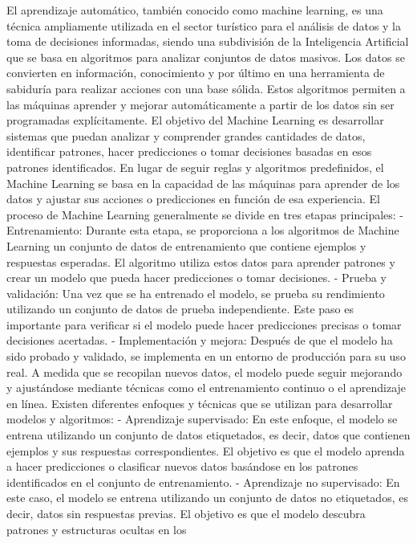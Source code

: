 \documentclass[
  letterpaper,
  DIV=11,
  numbers=noendperiod]{scrreprt}
\begin{document}
El aprendizaje automático, también conocido como machine learning, es
una técnica ampliamente utilizada en el sector turístico para el
análisis de datos y la toma de decisiones informadas, siendo una
subdivisión de la Inteligencia Artificial que se basa en algoritmos para
analizar conjuntos de datos masivos. Los datos se convierten en
información, conocimiento y por último en una herramienta de sabiduría
para realizar acciones con una base sólida. Estos algoritmos permiten a
las máquinas aprender y mejorar automáticamente a partir de los datos
sin ser programadas explícitamente. El objetivo del Machine Learning es
desarrollar sistemas que puedan analizar y comprender grandes cantidades
de datos, identificar patrones, hacer predicciones o tomar decisiones
basadas en esos patrones identificados. En lugar de seguir reglas y
algoritmos predefinidos, el Machine Learning se basa en la capacidad de
las máquinas para aprender de los datos y ajustar sus acciones o
predicciones en función de esa experiencia. El proceso de Machine
Learning generalmente se divide en tres etapas principales: -
Entrenamiento: Durante esta etapa, se proporciona a los algoritmos de
Machine Learning un conjunto de datos de entrenamiento que contiene
ejemplos y respuestas esperadas. El algoritmo utiliza estos datos para
aprender patrones y crear un modelo que pueda hacer predicciones o tomar
decisiones. - Prueba y validación: Una vez que se ha entrenado el
modelo, se prueba su rendimiento utilizando un conjunto de datos de
prueba independiente. Este paso es importante para verificar si el
modelo puede hacer predicciones precisas o tomar decisiones acertadas. -
Implementación y mejora: Después de que el modelo ha sido probado y
validado, se implementa en un entorno de producción para su uso real. A
medida que se recopilan nuevos datos, el modelo puede seguir mejorando y
ajustándose mediante técnicas como el entrenamiento continuo o el
aprendizaje en línea. Existen diferentes enfoques y técnicas que se
utilizan para desarrollar modelos y algoritmos: - Aprendizaje
supervisado: En este enfoque, el modelo se entrena utilizando un
conjunto de datos etiquetados, es decir, datos que contienen ejemplos y
sus respuestas correspondientes. El objetivo es que el modelo aprenda a
hacer predicciones o clasificar nuevos datos basándose en los patrones
identificados en el conjunto de entrenamiento. - Aprendizaje no
supervisado: En este caso, el modelo se entrena utilizando un conjunto
de datos no etiquetados, es decir, datos sin respuestas previas. El
objetivo es que el modelo descubra patrones y estructuras ocultas en los
\end{document}
